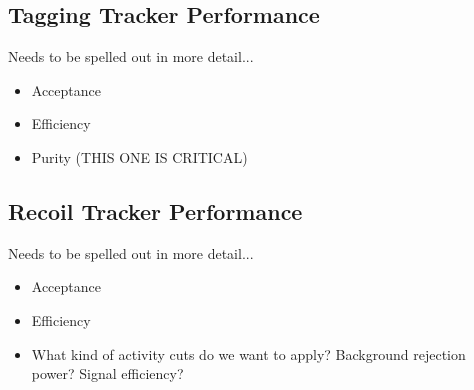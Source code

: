 
\subsection{Tagging Tracker Performance}

Needs to be spelled out in more detail...
\begin{itemize}
    \item Acceptance
    \item Efficiency 
    \item Purity (THIS ONE IS CRITICAL)
\end{itemize}

\subsection{Recoil Tracker Performance}

Needs to be spelled out in more detail...
\begin{itemize}
    \item Acceptance
    \item Efficiency 
    \item What kind of activity cuts do we want to apply?  Background rejection
          power?  Signal efficiency? 
\end{itemize}




